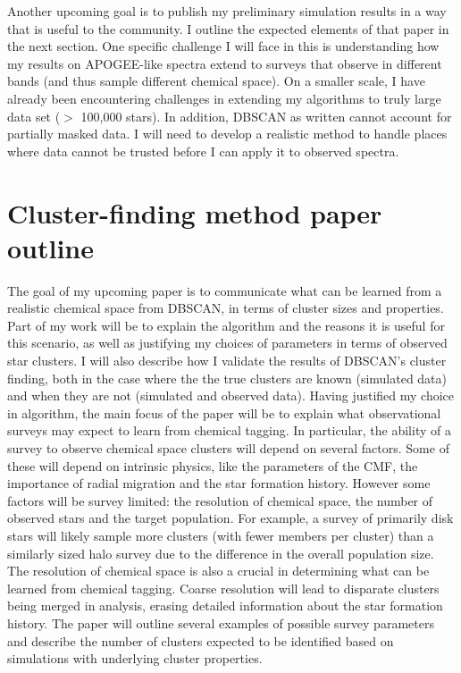 \documentclass[11pt]{article}
\begin{document}
    Another upcoming goal is to publish my preliminary simulation results in a way that is useful to the community. I outline the expected elements of that paper in the next section. One specific challenge I will face in this is understanding how my results on APOGEE-like spectra extend to surveys that observe in different bands (and thus sample different chemical space). On a smaller scale, I have already been encountering challenges in extending my algorithms to truly large data set ($>$ 100,000 stars). In addition, DBSCAN as written cannot account for partially masked data. I will need to develop a realistic method to handle places where data cannot be trusted before I can apply it to observed spectra.
   
 
\section*{Cluster-finding method paper outline}

The goal of my upcoming paper is to communicate what can be learned from a realistic chemical space from DBSCAN, in terms of cluster sizes and properties. Part of my work will be to explain the algorithm and the reasons it is useful for this scenario, as well as justifying my choices of parameters in terms of observed star clusters. I will also describe how I validate the results of DBSCAN's cluster finding, both in the case where the the true clusters are known (simulated data) and when they are not (simulated and observed data). Having justified my choice in algorithm, the main focus of the paper will be to explain what observational surveys may expect to learn from chemical tagging. In particular, the ability of a survey to observe chemical space clusters will depend on several factors. Some of these will depend on intrinsic physics, like the parameters of the CMF, the importance of radial migration and the star formation history. However some factors will be survey limited: the resolution of chemical space, the number of observed stars and the target population. For example, a survey of primarily disk stars will likely sample more clusters (with fewer members per cluster) than a similarly sized halo survey due to the difference in the overall population size. The resolution of chemical space is also a crucial in determining what can be learned from chemical tagging. Coarse resolution will lead to disparate clusters being merged in analysis, erasing detailed information about the star formation history. The paper will outline several examples of possible survey parameters and describe the number of clusters expected to be identified based on simulations with underlying cluster properties.
\end{document}

